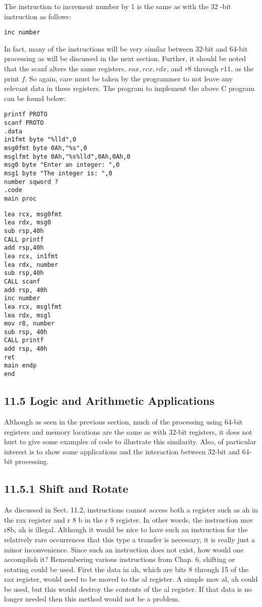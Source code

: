 \documentclass[10pt]{article}
\begin{document}
The instruction to increment number by 1 is the same as with the 32 -bit instruction as follows:

\begin{verbatim}
inc number
\end{verbatim}

In fact, many of the instructions will be very similar between 32-bit and 64-bit processing as will be discussed in the next section. Further, it should be noted that the scanf alters the same registers, $r a x, r c x, r d x$, and $r 8$ through $r 11$, as the print $f$. So again, care must be taken by the programmer to not leave any relevant data in these registers. The program to implement the above C program can be found below:

\begin{verbatim}
printf PROTO
scanf PROTO
.data
in1fmt byte "%lld",0
msg0fmt byte 0Ah,"%s",0
msglfmt byte 0Ah,"%s%lld",0Ah,0Ah,0
msg0 byte "Enter an integer: ",0
msg1 byte "The integer is: ",0
number sqword ?
.code
main proc
\end{verbatim}

\begin{verbatim}
lea rcx, msg0fmt
lea rdx, msg0
sub rsp,40h
CALL printf
add rsp,40h
lea rcx, in1fmt
lea rdx, number
sub rsp,40h
CALL scanf
add rsp, 40h
inc number
lea rcx, msglfmt
lea rdx, msgl
mov r8, number
sub rsp, 40h
CALL printf
add rsp, 40h
ret
main endp
end
\end{verbatim}

\subsection*{11.5 Logic and Arithmetic Applications}
Although as seen in the previous section, much of the processing using 64-bit registers and memory locations are the same as with 32-bit registers, it does not hurt to give some examples of code to illustrate this similarity. Also, of particular interest is to show some applications and the interaction between 32-bit and 64-bit processing.

\subsection*{11.5.1 Shift and Rotate}
As discussed in Sect. 11.2, instructions cannot access both a register such as ah in the rax register and r 8 b in the r 8 register. In other words, the instruction mov r8b, ah is illegal. Although it would be nice to have such an instruction for the\\
relatively rare occurrences that this type a transfer is necessary, it is really just a minor inconvenience. Since such an instruction does not exist, how would one accomplish it? Remembering various instructions from Chap. 6, shifting or rotating could be used. First the data in ah, which are bits 8 through 15 of the rax register, would need to be moved to the al register. A simple mov al, ah could be used, but this would destroy the contents of the al register. If that data is no longer needed then this method would not be a problem.
\end{document}
